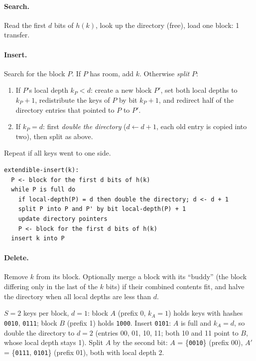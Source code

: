 \paragraph{Search.} Read the first $d$ bits of $h(k)$, look up the directory
(free), load one block: 1 transfer.

\paragraph{Insert.} Search for the block $P$. If $P$ has room, add $k$. Otherwise
\emph{split} $P$:
\begin{enumerate}
  \item If $P$'s local depth $k_P < d$: create a new block $P'$, set both local
        depths to $k_P + 1$, redistribute the keys of $P$ by bit $k_P + 1$, and
        redirect half of the directory entries that pointed to $P$ to $P'$.
  \item If $k_P = d$: first \emph{double the directory} ($d \leftarrow d + 1$,
        each old entry is copied into two), then split as above.
\end{enumerate}
Repeat if all keys went to one side.

\begin{lstlisting}
extendible-insert(k):
  P <- block for the first d bits of h(k)
  while P is full do
    if local-depth(P) = d then double the directory; d <- d + 1
    split P into P and P' by bit local-depth(P) + 1
    update directory pointers
    P <- block for the first d bits of h(k)
  insert k into P
\end{lstlisting}

\paragraph{Delete.} Remove $k$ from its block. Optionally merge a block with its
``buddy'' (the block differing only in the last of the $k$ bits) if their
combined contents fit, and halve the directory when all local depths are less
than $d$.

\begin{example}
$S = 2$ keys per block, $d = 1$: block $A$ (prefix 0, $k_A = 1$) holds keys with
hashes \texttt{0010}, \texttt{0111}; block $B$ (prefix 1) holds \texttt{1000}.
Insert \texttt{0101}: $A$ is full and $k_A = d$, so double the directory to
$d = 2$ (entries 00, 01, 10, 11; both 10 and 11 point to $B$, whose local depth
stays 1). Split $A$ by the second bit: $A$ = \{\texttt{0010}\} (prefix 00),
$A'$ = \{\texttt{0111}, \texttt{0101}\} (prefix 01), both with local depth 2.
\end{example}

